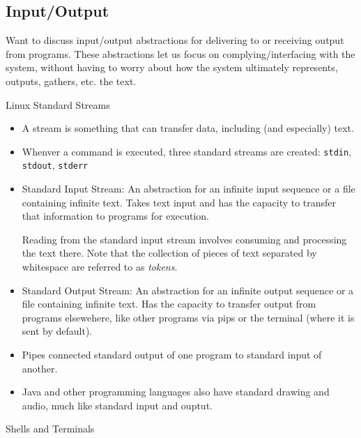 \documentclass[12pt]{article}
\theoremstyle{plain}
\theoremstyle{definition}
\theoremstyle{remark}
\begin{document}
\clearpage
\subsection{Input/Output}

Want to discuss input/output abstractions for delivering to or receiving
output from programs.
These abstractions let us focus on complying/interfacing with the
system, without having to worry about how the system ultimately
represents, outputs, gathers, etc. the text.

Linux Standard Streams
\begin{itemize}
  \item A stream is something that can transfer data, including (and
    especially) text.
  \item Whenver a command is executed, three standard streams are
    created:
    \texttt{stdin},
    \texttt{stdout},
    \texttt{stderr}

  \item Standard Input Stream:
    An abstraction for an infinite input sequence or a file containing
    infinite text.
    Takes text input and has the capacity to transfer that information
    to programs for execution.

    Reading from the standard input stream involves consuming and
    processing the text there.
    Note that the collection of pieces of text separated by
    whitespace are referred to as \emph{tokens}.

  \item Standard Output Stream:
    An abstraction for an infinite output sequence or a file containing
    infinite text.
    Has the capacity to transfer output from programs elsewehere, like
    other programs via pips or the terminal (where it is sent by
    default).

  \item Pipes connected standard output of one program to standard input
    of another.

  \item
    Java and other programming languages also have standard drawing and
    audio, much like standard input and ouptut.
\end{itemize}
Shells and Terminals
\end{document}
